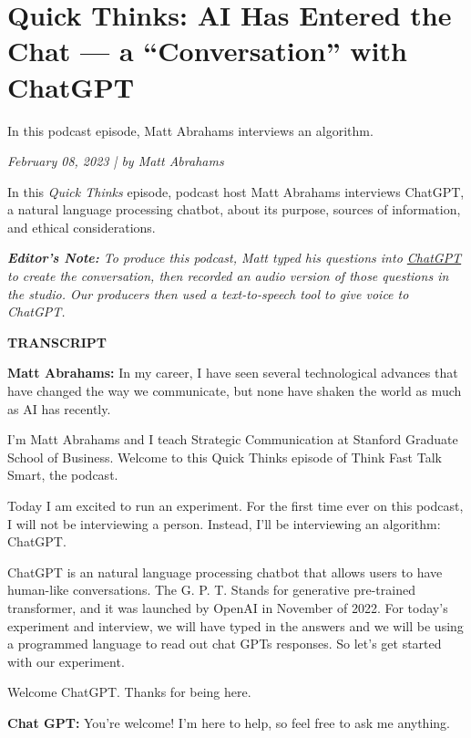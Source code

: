 \documentclass{article}
\begin{document}
\section*{Quick Thinks: AI Has Entered the Chat — a “Conversation” with ChatGPT}

In this podcast episode, Matt Abrahams interviews an algorithm.

\begin{flushright}
    \textit{February 08, 2023 | by Matt Abrahams}
\end{flushright}

In this \textsl{Quick Thinks} episode, podcast host Matt Abrahams interviews ChatGPT, a natural language processing chatbot, about its purpose, sources of information, and ethical considerations.

\textsl{\textbf{Editor’s Note:} To produce this podcast, Matt typed his questions into \href{https://openai.com/blog/chatgpt/" target="_blank}{ChatGPT} to create the conversation, then recorded an audio version of those questions in the studio. Our producers then used a text-to-speech tool to give voice to ChatGPT.}

\vspace{1em}
\large{\textbf{TRANSCRIPT}}
\vspace{1em}



\textbf{Matt Abrahams: }In my career, I have seen several technological advances that have changed the way we communicate, but none have shaken the world as much as AI has recently.

I’m Matt Abrahams and I teach Strategic Communication at Stanford Graduate School of Business. Welcome to this Quick Thinks episode of Think Fast Talk Smart, the podcast.

Today I am excited to run an experiment. For the first time ever on this podcast, I will not be interviewing a person. Instead, I’ll be interviewing an algorithm: ChatGPT.

ChatGPT is an natural language processing chatbot that allows users to have human-like conversations. The G. P. T. Stands for generative pre-trained transformer, and it was launched by OpenAI in November of 2022. For today’s experiment and interview, we will have typed in the answers and we will be using a programmed language to read out chat GPTs responses. So let’s get started with our experiment.

Welcome ChatGPT. Thanks for being here.

\textbf{Chat GPT: }You’re welcome! I’m here to help, so feel free to ask me anything.
\end{document}
